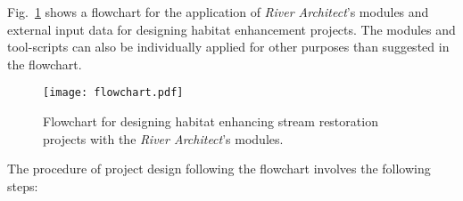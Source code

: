 Fig.~\ref{fig:flowchart} shows a flowchart for the application of \textit{River Architect}'s modules and external input data for designing habitat enhancement projects. The modules and tool-scripts can also be individually applied for other purposes than suggested in the flowchart.\\

\begin{figure}[!hbt]
	\begin{center}
	\texttt{[image: flowchart.pdf]} %
	\caption{Flowchart for designing habitat enhancing stream restoration projects with the \textit{River Architect}'s modules.\label{fig:flowchart}}
	\end{center}
\end{figure}

The procedure of project design following the flowchart involves the following steps:

